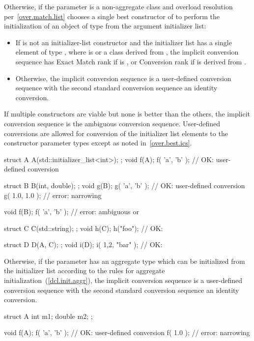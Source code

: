 \pnum
Otherwise, if the parameter is a non-aggregate class  and overload
resolution per~\ref{over.match.list} chooses a single best constructor  of
 to perform the initialization of an object of type  from the
argument initializer list:
\begin{itemize}
\item
If  is not an initializer-list constructor
and the initializer list has a single element of type \cv{} ,
where  is  or a class derived from ,
the implicit conversion sequence has Exact Match rank if  is ,
or Conversion rank if  is derived from .
\item
Otherwise, the implicit conversion sequence is a user-defined
conversion sequence with the second standard conversion sequence an
identity conversion.
\end{itemize}
If multiple constructors are viable but none is better than
the others, the implicit conversion sequence is the ambiguous conversion
sequence. User-defined conversions are allowed for conversion of the initializer
list elements to the constructor parameter types except as noted
in~\ref{over.best.ics}. \begin{example}
\begin{codeblock}
struct A {
  A(std::initializer_list<int>);
};
void f(A);
f( {'a', 'b'} );            // OK:  user-defined conversion

struct B {
  B(int, double);
};
void g(B);
g( {'a', 'b'} );            // OK:  user-defined conversion
g( {1.0, 1.0} );            // error: narrowing

void f(B);
f( {'a', 'b'} );            // error: ambiguous  or 

struct C {
  C(std::string);
};
void h(C);
h({"foo"});                 // OK: 

struct D {
  D(A, C);
};
void i(D);
i({ {1,2}, {"bar"} });      // OK: 
\end{codeblock}
\end{example}

\pnum
Otherwise, if the parameter has an aggregate type which can be initialized from
the initializer list according to the rules for aggregate
initialization~(\ref{dcl.init.aggr}), the implicit conversion sequence is a
user-defined conversion sequence with the second standard conversion
sequence an identity conversion. \begin{example}
\begin{codeblock}
struct A {
  int m1;
  double m2;
};

void f(A);
f( {'a', 'b'} );            // OK:  user-defined conversion 
f( {1.0} );                 // error: narrowing
\end{codeblock}
\end{example}

